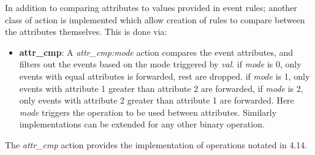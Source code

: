 In addition to comparing attributes to values provided in event rules; another class of action is implemented which allow creation of rules to compare between the attributes themselves. This is done via:
\begin{itemize}
	\item \textbf{attr_cmp}: A \textit{attr_cmp:mode} action compares the event attributes, and filters out the events based on the mode triggered by \textit{val}. if \textit{mode} is 0, only events with equal attributes is forwarded, rest are dropped. if \textit{mode} is 1, only events with attribute 1 greater than attribute 2 are forwarded, if \textit{mode} is 2, only events with attribute 2 greater than attribute 1 are forwarded. Here \textit{mode} triggers the operation to be used between attributes. Similarly implementations can be extended for any other binary operation.
\end{itemize}
The  \textit{attr_cmp} action provides the implementation of operations notated in 4.14.

